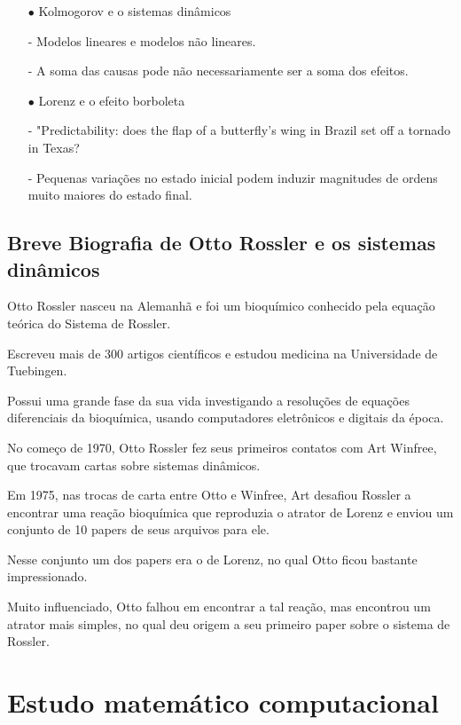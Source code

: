 \documentclass[12pt,a4paper]{article} %
\theoremstyle{definition}
\numberwithin{equation}{ex}
\theoremstyle{definition}
\begin{document}
\begin{itemize}
	\item [$\bullet$] Kolmogorov e o sistemas dinâmicos
	
	- Modelos lineares e modelos não lineares.
	
	- A soma das causas pode não necessariamente ser a soma dos efeitos.
		
	\item [$\bullet$] Lorenz e o efeito borboleta
		
	- "Predictability: does the flap of a butterfly's wing in Brazil set off a tornado in Texas?
		
	- Pequenas variações no estado inicial podem induzir magnitudes de ordens muito maiores do estado final.
	
\end{itemize}

\subsection{Breve Biografia de Otto Rossler e os sistemas dinâmicos}

	 Otto Rossler nasceu na Alemanhã e foi um bioquímico conhecido pela equação teórica do Sistema de Rossler. 
	
	Escreveu mais de 300 artigos científicos e estudou medicina na Universidade de Tuebingen.
	
	Possui uma grande fase da sua vida investigando a resoluções de equações diferenciais da bioquímica, usando computadores eletrônicos e digitais da época.
			
 	No começo de 1970, Otto Rossler fez seus primeiros contatos com Art Winfree, que trocavam cartas sobre sistemas dinâmicos.

	Em 1975, nas trocas de carta entre Otto e Winfree, Art desafiou Rossler a encontrar uma reação bioquímica que reproduzia o atrator de Lorenz e enviou um conjunto de 10 papers de seus arquivos para ele.
			
	Nesse conjunto um dos papers era o de Lorenz, no qual Otto ficou bastante impressionado.
			
	Muito influenciado, Otto falhou em encontrar a tal reação, mas encontrou um atrator mais simples, no qual deu origem a seu primeiro paper sobre o sistema de Rossler.


\section{Estudo matemático computacional}
\end{document}

